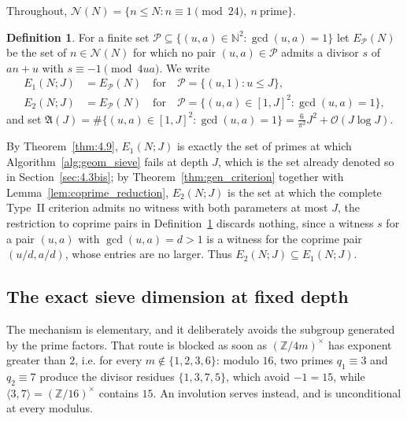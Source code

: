 \documentclass[11pt, a4paper]{article}
\theoremstyle{plain}
\theoremstyle{definition}
\newtheorem{definition}[theorem]{Definition}
\newcommand{\N}{\mathbb{N}}
\newcommand{\Z}{\mathbb{Z}}
\begin{document}
Throughout, $\mathcal{N}(N)=\{n\le N: n\equiv1\pmod{24},\ n\ \text{prime}\}$.

\begin{definition}\label{def:EP}
For a finite set $\mathcal{P}\subseteq\{(u,a)\in\N^{2}:\gcd(u,a)=1\}$ let $E_{\mathcal{P}}(N)$ be the set of $n\in\mathcal{N}(N)$ for which no pair $(u,a)\in\mathcal{P}$ admits a divisor $s$ of $an+u$ with $s\equiv-1\pmod{4ua}$. We write
\begin{align*}
E_1(N;J)&=E_{\mathcal{P}}(N)\quad \text{for}\quad \mathcal{P}=\{(u,1):u\le J\},\\
E_2(N;J)&=E_{\mathcal{P}}(N)\quad \text{for}\quad \mathcal{P}=\{(u,a)\in[1,J]^{2}:\gcd(u,a)=1\},
\end{align*}
and set $\mathfrak{A}(J)=\#\{(u,a)\in[1,J]^{2}:\gcd(u,a)=1\}=\frac{6}{\pi^{2}}J^{2}+\mathcal{O}(J\log J)$.
\end{definition}

By Theorem~\ref{thm:4.9}, $E_1(N;J)$ is exactly the set of primes at which Algorithm~\ref{alg:geom_sieve} fails at depth $J$, which is the set already denoted so in Section~\ref{sec:4.3bis}; by Theorem~\ref{thm:gen_criterion} together with Lemma~\ref{lem:coprime_reduction}, $E_2(N;J)$ is the set at which the complete Type~II criterion admits no witness with both parameters at most $J$, the restriction to coprime pairs in Definition~\ref{def:EP} discards nothing, since a witness $s$ for a pair $(u,a)$ with $\gcd(u,a)=d>1$ is a witness for the coprime pair $(u/d,a/d)$, whose entries are no larger. Thus $E_2(N;J)\subseteq E_1(N;J)$.

\subsection{The exact sieve dimension at fixed depth} \label{sec:fixed_depth_sub}

The mechanism is elementary, and it deliberately avoids the subgroup generated by the prime factors. That route is blocked as soon as $(\Z/4m)^{\times}$ has exponent greater than $2$, i.e. for every $m\notin\{1,2,3,6\}$: modulo $16$, two primes $q_1\equiv3$ and $q_2\equiv7$ produce the divisor residues $\{1,3,7,5\}$, which avoid $-1=15$, while $\langle 3,7\rangle=(\Z/16)^{\times}$ contains $15$. An involution serves instead, and is unconditional at every modulus.
\end{document}
